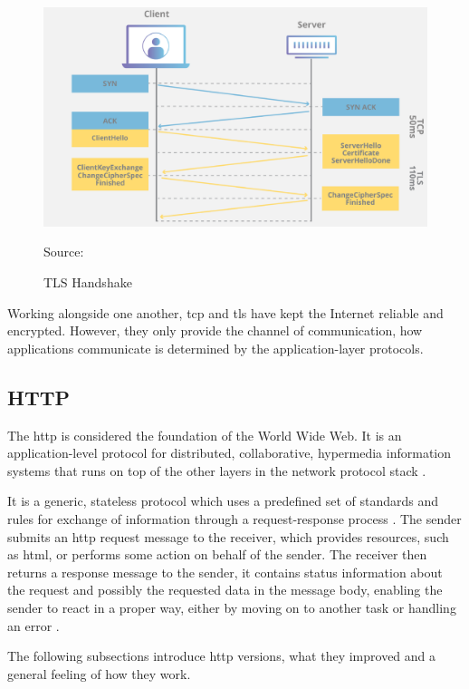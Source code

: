 \begin{figure}[ht]
    \centering
    \includegraphics[width=\linewidth]{figures/tls-ssl-handshake.png}
    \caption{TLS Handshake}
    {Source: \cite{what_is_a_tls_handshake}}
    \label{figure:tls_handshake}
\end{figure}

Working alongside one another, \gls{tcp} and \gls{tls} have kept the Internet reliable and encrypted. However, they only provide the channel of communication, how applications communicate is determined by the application-layer protocols.

\subsection{HTTP}

The \gls{http} is considered the foundation of the World Wide Web. It is an application-level protocol for distributed, collaborative, hypermedia information systems that runs on top of the other layers in the network protocol stack \cite{rfc1945, rfc2616, what_is_http}.

It is a generic, stateless protocol which uses a predefined set of standards and rules for exchange of information through a request-response process \cite{rfc1945, rfc2616}. The sender submits an \gls{http} request message to the receiver, which provides resources, such as \gls{html}, or performs some action on behalf of the sender. The receiver then returns a response message to the sender, it contains status information about the request and possibly the requested data in the message body, enabling the sender to react in a proper way, either by moving on to another task or handling an error \cite{rfc2616}.

The following subsections introduce \gls{http} versions, what they improved and a general feeling of how they work.

